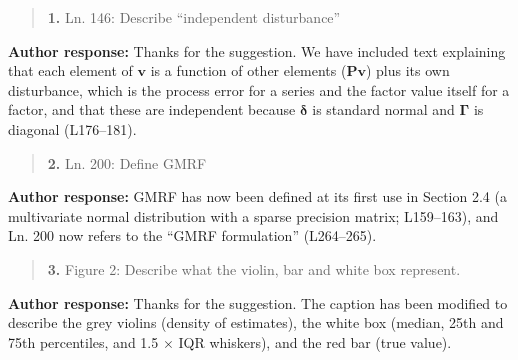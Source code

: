 \documentclass[11pt]{article}
\begin{document}
\begin{quote}
\textbf{1.} Ln. 146: Describe ``independent disturbance''
\end{quote}

\textbf{Author response:} Thanks for the suggestion. We have included
text explaining that each element of \(\mathbf{v}\) is a function of
other elements (\(\mathbf{Pv}\)) plus its own disturbance, which is the
process error for a series and the factor value itself for a factor, and
that these are independent because \(\boldsymbol{\delta}\) is standard
normal and \(\boldsymbol{\Gamma}\) is diagonal (L176--181).

\begin{quote}
\textbf{2.} Ln. 200: Define GMRF
\end{quote}

\textbf{Author response:} GMRF has now been defined at its first use in
Section 2.4 (a multivariate normal distribution with a sparse precision
matrix; L159--163), and Ln. 200 now refers to the ``GMRF formulation''
(L264--265).

\begin{quote}
\textbf{3.} Figure 2: Describe what the violin, bar and white box
represent.
\end{quote}

\textbf{Author response:} Thanks for the suggestion. The caption has
been modified to describe the grey violins (density of estimates), the
white box (median, 25th and 75th percentiles, and 1.5 \(\times\) IQR
whiskers), and the red bar (true value).
\end{document}
